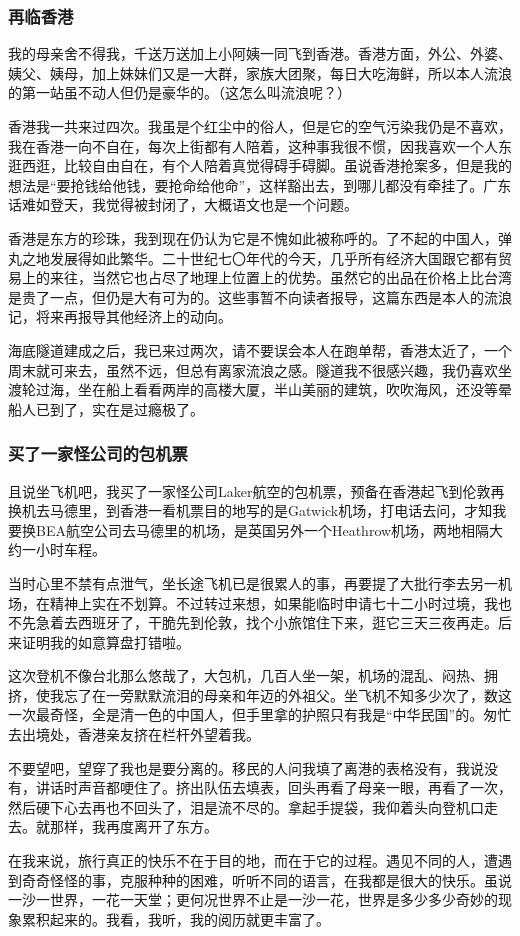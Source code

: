 \subsubsection*{再临香港}
\par 我的母亲舍不得我，千送万送加上小阿姨一同飞到香港。香港方面，外公、外婆、姨父、姨母，加上妹妹们又是一大群，家族大团聚，每日大吃海鲜，所以本人流浪的第一站虽不动人但仍是豪华的。（这怎么叫流浪呢？）
\par 香港我一共来过四次。我虽是个红尘中的俗人，但是它的空气污染我仍是不喜欢，我在香港一向不自在，每次上街都有人陪着，这种事我很不惯，因我喜欢一个人东逛西逛，比较自由自在，有个人陪着真觉得碍手碍脚。虽说香港抢案多，但是我的想法是“要抢钱给他钱，要抢命给他命”，这样豁出去，到哪儿都没有牵挂了。广东话难如登天，我觉得被封闭了，大概语文也是一个问题。
\par 香港是东方的珍珠，我到现在仍认为它是不愧如此被称呼的。了不起的中国人，弹丸之地发展得如此繁华。二十世纪七〇年代的今天，几乎所有经济大国跟它都有贸易上的来往，当然它也占尽了地理上位置上的优势。虽然它的出品在价格上比台湾是贵了一点，但仍是大有可为的。这些事暂不向读者报导，这篇东西是本人的流浪记，将来再报导其他经济上的动向。
\par 海底隧道建成之后，我已来过两次，请不要误会本人在跑单帮，香港太近了，一个周末就可来去，虽然不远，但总有离家流浪之感。隧道我不很感兴趣，我仍喜欢坐渡轮过海，坐在船上看看两岸的高楼大厦，半山美丽的建筑，吹吹海风，还没等晕船人已到了，实在是过瘾极了。
\subsubsection*{买了一家怪公司的包机票}
\par 且说坐飞机吧，我买了一家怪公司Laker航空的包机票，预备在香港起飞到伦敦再换机去马德里，到香港一看机票目的地写的是Gatwick机场，打电话去问，才知我要换BEA航空公司去马德里的机场，是英国另外一个Heathrow机场，两地相隔大约一小时车程。
\par 当时心里不禁有点泄气，坐长途飞机已是很累人的事，再要提了大批行李去另一机场，在精神上实在不划算。不过转过来想，如果能临时申请七十二小时过境，我也不先急着去西班牙了，干脆先到伦敦，找个小旅馆住下来，逛它三天三夜再走。后来证明我的如意算盘打错啦。
\par 这次登机不像台北那么悠哉了，大包机，几百人坐一架，机场的混乱、闷热、拥挤，使我忘了在一旁默默流泪的母亲和年迈的外祖父。坐飞机不知多少次了，数这一次最奇怪，全是清一色的中国人，但手里拿的护照只有我是“中华民国”的。匆忙去出境处，香港亲友挤在栏杆外望着我。
\par 不要望吧，望穿了我也是要分离的。移民的人问我填了离港的表格没有，我说没有，讲话时声音都哽住了。挤出队伍去填表，回头再看了母亲一眼，再看了一次，然后硬下心去再也不回头了，泪是流不尽的。拿起手提袋，我仰着头向登机口走去。就那样，我再度离开了东方。
\par 在我来说，旅行真正的快乐不在于目的地，而在于它的过程。遇见不同的人，遭遇到奇奇怪怪的事，克服种种的困难，听听不同的语言，在我都是很大的快乐。虽说一沙一世界，一花一天堂；更何况世界不止是一沙一花，世界是多少多少奇妙的现象累积起来的。我看，我听，我的阅历就更丰富了。
